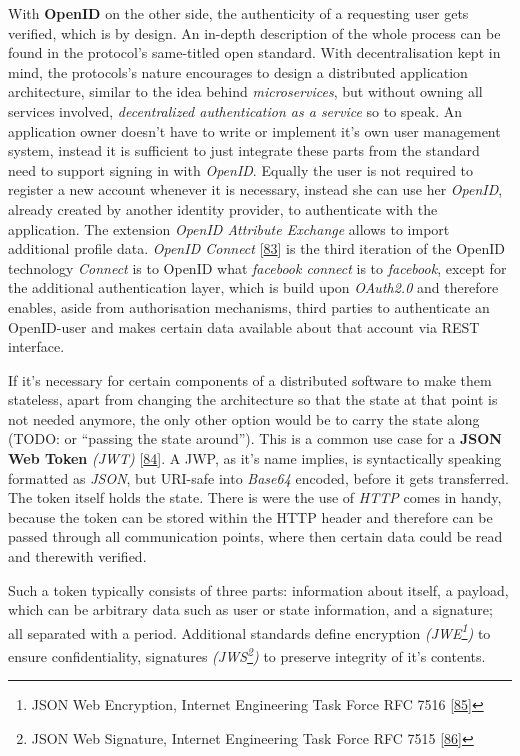 \documentclass[12pt,english,a4paper,titlepage,cleardoublepage=empty,dottedtoc]{report}
\begin{document}
With \textbf{OpenID} on the other side, the authenticity of a requesting
user gets verified, which is by design. An in-depth description of the
whole process can be found in the protocol's same-titled open standard.
With decentralisation kept in mind, the protocols's nature encourages to
design a distributed application architecture, similar to the idea
behind \emph{microservices}, but without owning all services involved,
\emph{decentralized authentication as a service} so to speak. An
application owner doesn't have to write or implement it's own user
management system, instead it is sufficient to just integrate these
parts from the standard need to support signing in with \emph{OpenID}.
Equally the user is not required to register a new account whenever it
is necessary, instead she can use her \emph{OpenID}, already created by
another identity provider, to authenticate with the application. The
extension \emph{OpenID Attribute Exchange} allows to import additional
profile data. \emph{OpenID Connect}
{[}\protect\hyperlink{ref-web_spec_openid-connect-1}{83}{]} is the third
iteration of the OpenID technology \emph{Connect} is to OpenID what
\emph{facebook connect} is to \emph{facebook}, except for the additional
authentication layer, which is build upon \emph{OAuth2.0} and therefore
enables, aside from authorisation mechanisms, third parties to
authenticate an OpenID-user and makes certain data available about that
account via REST interface.

If it's necessary for certain components of a distributed software to
make them stateless, apart from changing the architecture so that the
state at that point is not needed anymore, the only other option would
be to carry the state along (TODO: or ``passing the state around'').
This is a common use case for a \textbf{JSON Web Token} \emph{(JWT)}
{[}\protect\hyperlink{ref-web_spec_json-web-token}{84}{]}. A JWP, as
it's name implies, is syntactically speaking formatted as \emph{JSON},
but URI-safe into \emph{Base64} encoded, before it gets transferred. The
token itself holds the state. There is were the use of \emph{HTTP} comes
in handy, because the token can be stored within the HTTP header and
therefore can be passed through all communication points, where then
certain data could be read and therewith verified.

Such a token typically consists of three parts: information about
itself, a payload, which can be arbitrary data such as user or state
information, and a signature; all separated with a period. Additional
standards define encryption \emph{(JWE\footnote{JSON Web Encryption,
  Internet Engineering Task Force RFC 7516
  {[}\protect\hyperlink{ref-web_spec_json-web-encryption}{85}{]}})} to
ensure confidentiality, signatures \emph{(JWS\footnote{JSON Web
  Signature, Internet Engineering Task Force RFC 7515
  {[}\protect\hyperlink{ref-web_spec_json-web-signature}{86}{]}})} to
preserve integrity of it's contents.
\end{document}
